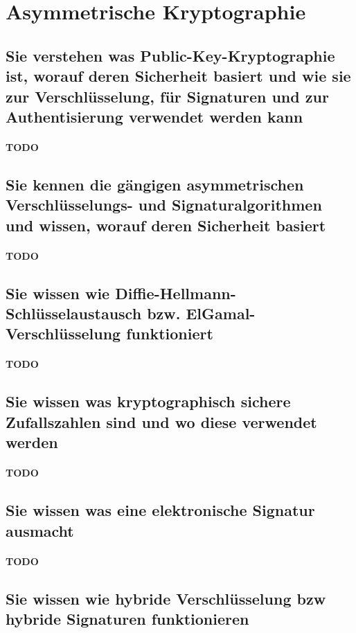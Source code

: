 \documentclass[10pt,a4paper]{article}
\begin{document}
\section{Asymmetrische Kryptographie}
\subsection*{Sie verstehen was Public-Key-Kryptographie ist, worauf deren Sicherheit basiert und wie sie zur Verschlüsselung, für Signaturen und zur Authentisierung verwendet werden kann}
\paragraph*{TODO}
\subsection*{Sie kennen die gängigen asymmetrischen Verschlüsselungs- und Signaturalgorithmen und wissen, worauf deren Sicherheit basiert}
\paragraph*{TODO}
\subsection*{Sie wissen wie Diffie-Hellmann-Schlüsselaustausch bzw. ElGamal-Verschlüsselung funktioniert}
\paragraph*{TODO}
\subsection*{Sie wissen was kryptographisch sichere Zufallszahlen sind und wo diese verwendet werden}
\paragraph*{TODO}
\subsection*{Sie wissen was eine elektronische Signatur ausmacht}
\paragraph*{TODO}
\subsection*{Sie wissen wie hybride Verschlüsselung bzw hybride Signaturen funktionieren}
\end{document}
